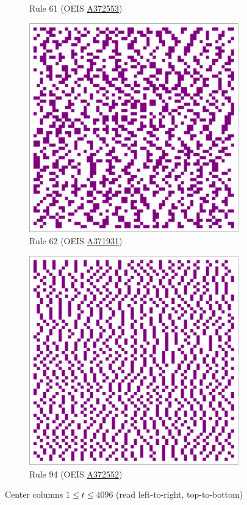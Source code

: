 \documentclass{article}
\begin{document}
\begin{figure}[H]
\begin{subfigure}[b]{0.49\textwidth}
        \caption{Rule 61 (OEIS \href{https://oeis.org/A372553}{A372553})}
        \label{fig:rule-61-center_column_plot-4096}
    \end{subfigure}
    \begin{subfigure}[b]{0.49\textwidth}
        \centering
        \includegraphics[width=.8\textwidth]{graphics/behavior/center-columns/rule-62-center_column_plot-4096.pdf}
        \caption{Rule 62 (OEIS \href{https://oeis.org/A371931}{A371931})}
        \label{fig:rule-62-center_column_plot-4096}
    \end{subfigure}
    \vspace{4pt}
    \begin{subfigure}[b]{0.49\textwidth}
        \centering
        \includegraphics[width=.8\textwidth]{graphics/behavior/center-columns/rule-94-center_column_plot-4096.pdf}
        \caption{Rule 94 (OEIS \href{https://oeis.org/A372552}{A372552})}
        \label{fig:rule-94-center_column_plot-4096}
    \end{subfigure}
       \caption{Center columns $1\leq t \leq 4096$ (read left-to-right, top-to-bottom)}
       \label{fig:center-columns}
\end{figure}
\end{document}
